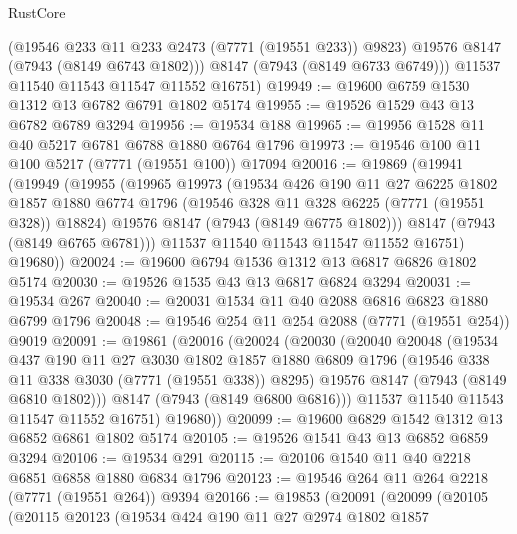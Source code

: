 \begin{lexlean}{RustCore}
\begin{coremodule}
          (@19546 @233 @11 @233 @2473 (@7771 (@19551 @233)) @9823)
          @19576
          @8147
          (@7943 (@8149 @6743 @1802)))
        @8147
        (@7943 (@8149 @6733 @6749)))
      @11537
      @11540
      @11543
      @11547
      @11552
      @16751)
@19949 := @19600 @6759 @1530 @1312 @13 @6782 @6791 @1802 @5174
@19955 := @19526 @1529 @43 @13 @6782 @6789 @3294
@19956 := @19534 @188
@19965 := @19956 @1528 @11 @40 @5217 @6781 @6788 @1880 @6764 @1796
@19973 := @19546 @100 @11 @100 @5217 (@7771 (@19551 @100)) @17094
@20016 := @19869
    (@19941
      (@19949
        (@19955
          (@19965
            @19973
            (@19534
              @426
              @190
              @11
              @27
              @6225
              @1802
              @1857
              @1880
              @6774
              @1796
              (@19546 @328 @11 @328 @6225 (@7771 (@19551 @328)) @18824)
              @19576
              @8147
              (@7943 (@8149 @6775 @1802)))
            @8147
            (@7943 (@8149 @6765 @6781)))
          @11537
          @11540
          @11543
          @11547
          @11552
          @16751)
        @19680))
@20024 := @19600 @6794 @1536 @1312 @13 @6817 @6826 @1802 @5174
@20030 := @19526 @1535 @43 @13 @6817 @6824 @3294
@20031 := @19534 @267
@20040 := @20031 @1534 @11 @40 @2088 @6816 @6823 @1880 @6799 @1796
@20048 := @19546 @254 @11 @254 @2088 (@7771 (@19551 @254)) @9019
@20091 := @19861
    (@20016
      (@20024
        (@20030
          (@20040
            @20048
            (@19534
              @437
              @190
              @11
              @27
              @3030
              @1802
              @1857
              @1880
              @6809
              @1796
              (@19546 @338 @11 @338 @3030 (@7771 (@19551 @338)) @8295)
              @19576
              @8147
              (@7943 (@8149 @6810 @1802)))
            @8147
            (@7943 (@8149 @6800 @6816)))
          @11537
          @11540
          @11543
          @11547
          @11552
          @16751)
        @19680))
@20099 := @19600 @6829 @1542 @1312 @13 @6852 @6861 @1802 @5174
@20105 := @19526 @1541 @43 @13 @6852 @6859 @3294
@20106 := @19534 @291
@20115 := @20106 @1540 @11 @40 @2218 @6851 @6858 @1880 @6834 @1796
@20123 := @19546 @264 @11 @264 @2218 (@7771 (@19551 @264)) @9394
@20166 := @19853
    (@20091
      (@20099
        (@20105
          (@20115
            @20123
            (@19534
              @424
              @190
              @11
              @27
              @2974
              @1802
              @1857

\end{coremodule}
\end{lexlean}
